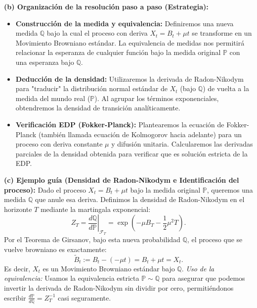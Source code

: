 \documentclass[11pt, letterpaper]{article}
\begin{document}
\vspace{5mm}

\begin{solucion}
    \textbf{(b) Organización de la resolución paso a paso (Estrategia):}
    \begin{itemize}
        \item[(i)] \textbf{Construcción de la medida y equivalencia:} Definiremos una nueva medida $\mathbb{Q}$ bajo la cual el proceso con deriva $X_t = B_t + \mu t$ se transforme en un Movimiento Browniano estándar. La equivalencia de medidas nos permitirá relacionar la esperanza de cualquier función bajo la medida original $\mathbb{P}$ con una esperanza bajo $\mathbb{Q}$.
        \item[(ii)] \textbf{Deducción de la densidad:} Utilizaremos la derivada de Radon-Nikodym para "traducir" la distribución normal estándar de $X_t$ (bajo $\mathbb{Q}$) de vuelta a la medida del mundo real ($\mathbb{P}$). Al agrupar los términos exponenciales, obtendremos la densidad de transición analíticamente.
        \item[(iii)] \textbf{Verificación EDP (Fokker-Planck):} Plantearemos la ecuación de Fokker-Planck (también llamada ecuación de Kolmogorov hacia adelante) para un proceso con deriva constante $\mu$ y difusión unitaria. Calcularemos las derivadas parciales de la densidad obtenida para verificar que es solución estricta de la EDP.
    \end{itemize}

    \vspace{3mm}
    \textbf{(c) Ejemplo guía (Densidad de Radon-Nikodym e Identificación del proceso):}
    Dado el proceso $X_t = B_t + \mu t$ bajo la medida original $\mathbb{P}$, queremos una medida $\mathbb{Q}$ que anule esa deriva. 
    Definimos la densidad de Radon-Nikodym en el horizonte $T$ mediante la martingala exponencial:
    \[ Z_T = \left.\frac{d\mathbb{Q}}{d\mathbb{P}}\right|_{\mathcal{F}_T} = \exp\left( -\mu B_T - \frac{1}{2}\mu^2 T \right). \]
    Por el Teorema de Girsanov, bajo esta nueva probabilidad $\mathbb{Q}$, el proceso que se vuelve browniano es exactamente:
    \[ \tilde{B}_t := B_t - (-\mu t) = B_t + \mu t = X_t. \]
    Es decir, $X_t$ es un Movimiento Browniano estándar bajo $\mathbb{Q}$. 
    \textit{Uso de la equivalencia:} Usamos la equivalencia estricta $\mathbb{P} \sim \mathbb{Q}$ para asegurar que podemos invertir la derivada de Radon-Nikodym sin dividir por cero, permitiéndonos escribir $\frac{d\mathbb{P}}{d\mathbb{Q}} = Z_T^{-1}$ casi seguramente.


\end{solucion}
\end{document}
